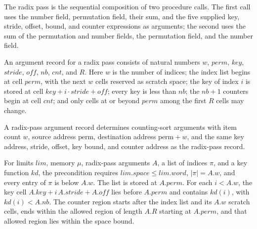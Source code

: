 \begin{definition}
\label{Light.radixPass}
\leanok
{}
The radix pass is the sequential composition of two procedure calls. The first call uses
the number field, permutation field, their sum, and the five supplied key, stride,
offset, bound, and counter expressions as arguments; the second uses the sum of the
permutation and number fields, the permutation field, and the number field.
\end{definition}

\begin{definition}
\label{Light.RadixPass.Args}
\leanok
An argument record for a radix pass consists of natural numbers $w$, $perm$, $key$,
$stride$, $off$, $nb$, $cnt$, and $R$. Here $w$ is the number of indices; the index list
begins at cell $perm$, with the next $w$ cells reserved as scratch space; the key of
index $i$ is stored at cell $key+i\cdot stride+off$; every key is less than $nb$; the
$nb+1$ counters begin at cell $cnt$; and only cells at or beyond $perm$ among the first
$R$ cells may change.
\end{definition}

\begin{definition}
\label{Light.RadixPass.Args.sort}
\leanok
{}
A radix-pass argument record determines counting-sort arguments with item count $w$,
source address $\mathrm{perm}$, destination address $\mathrm{perm}+w$, and the same key
address, stride, offset, key bound, and counter address as the radix-pass record.
\end{definition}

\begin{definition}
\label{Light.RadixPass.Pre}
\leanok
{}
For limits $lim$, memory $\mu$, radix-pass arguments $A$, a list of indices $\pi$, and a
key function $kd$, the precondition requires $lim.space\le lim.word$, $|\pi|=A.w$, and
every entry of $\pi$ is below $A.w$. The list is stored at $A.perm$. For each $i<A.w$,
the key cell $A.key+i\,A.stride+A.off$ lies before $A.perm$ and contains $kd(i)$, with
$kd(i)<A.nb$. The counter region starts after the index list and its $A.w$ scratch cells,
ends within the allowed region of length $A.R$ starting at $A.perm$, and that allowed
region lies within the space bound.
\end{definition}


